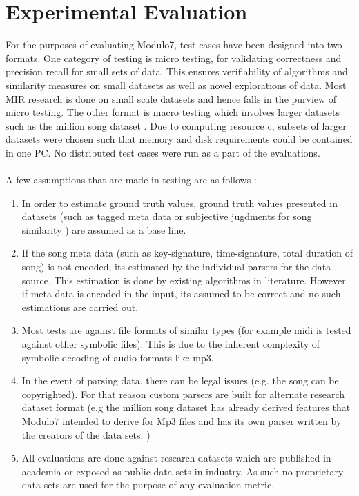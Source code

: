 \chapter{Experimental Evaluation}

\noindent For the purposes of evaluating Modulo7, test cases have been designed into two formats. One category of testing is micro testing, for validating correctness and precision recall for small sets of data. This ensures verifiability of algorithms and similarity measures on small datasets as well as novel explorations of data. Most MIR research is done on small scale datasets and hence falls in the purview of micro testing. The other format is macro testing which involves larger datasets such as the million song dataset \cite{msd}. Due to computing resource c, subsets of larger datasets were chosen such that memory and disk requirements could be  contained in one PC. No distributed test cases were run as a part of the evaluations. \\\\
A few assumptions that are made in testing are as follows :-
\begin{enumerate}
\item In order to estimate ground truth values, ground truth values presented in datasets (such as tagged meta data or subjective jugdments for song similarity ) are assumed as a base line.
\item If the song meta data (such as key-signature, time-signature, total duration of song) is not encoded, its estimated by the individual parsers for the data source. This estimation is done by existing algorithms in literature. However if meta data is encoded in the input, its assumed to be correct and no such estimations are carried out. 
\item Most tests are against file formats of similar types (for example midi is tested against other symbolic files). This is due to the inherent complexity of symbolic decoding of audio formats like mp3.
\item In the event of parsing data, there can be legal issues (e.g. the song can be copyrighted). For that reason custom parsers are built for alternate research dataset format (e.g the million song dataset has already derived features that Modulo7 intended to derive for Mp3 files and has its own parser written by the creators of the data sets. \cite{msd})
\item All evaluations are done against research datasets which are published in academia or exposed as public data sets in industry. As such no proprietary data sets are used for the purpose of any evaluation metric.
\end{enumerate}

